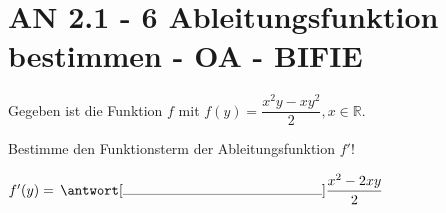 \section{AN 2.1 - 6 Ableitungsfunktion bestimmen - OA - BIFIE}

\begin{beispiel}[AN 2.1]{1} %
				Gegeben ist die Funktion $f$ mit $f(y)=\dfrac{x^2y-xy^2}{2},x\in\mathbb{R}$.

Bestimme den Funktionsterm der Ableitungsfunktion $f'$!
\leer

$f'(y)=\,\antwort[\rule{5cm}{0.3pt}]{\dfrac{x^2-2xy}{2}}$
\end{beispiel}
